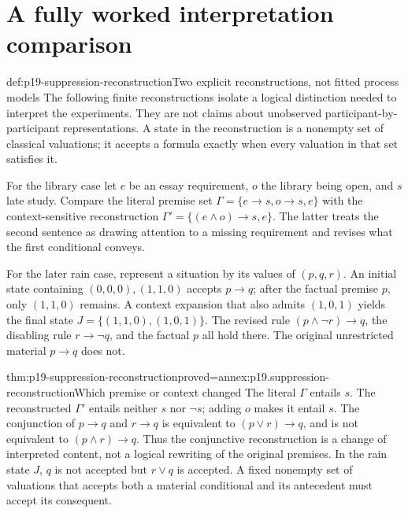 \section{A fully worked interpretation comparison}
\label{sec:p19-suppression-reconstruction}

\begin{hbdefinition}{def:p19-suppression-reconstruction}{Two explicit reconstructions, not fitted process models}
The following finite reconstructions isolate a logical distinction needed
to interpret the experiments. They are not claims about unobserved
participant-by-participant representations.
A state in the reconstruction is a nonempty set of classical valuations;
it accepts a formula exactly when every valuation in that set satisfies it.

For the library case let \(e\) be an essay requirement, \(o\) the library
being open, and \(s\) late study. Compare the literal premise set
\(\Gamma=\{e\to s,o\to s,e\}\) with the context-sensitive
reconstruction \(\Gamma'=\{(e\land o)\to s,e\}\).
The latter treats the second sentence as drawing attention to a missing
requirement and revises what the first conditional conveys.

For the later rain case, represent a situation by its values of
\((p,q,r)\). An initial state containing
\((0,0,0),(1,1,0)\) accepts \(p\to q\); after the factual premise
\(p\), only \((1,1,0)\) remains. A context expansion that also admits
\((1,0,1)\) yields the final state
\(J=\{(1,1,0),(1,0,1)\}\). The revised rule
\((p\land\neg r)\to q\), the disabling rule \(r\to\neg q\), and
the factual \(p\) all hold there. The original unrestricted material
\(p\to q\) does not.
\end{hbdefinition}

\begin{hblemma}{thm:p19-suppression-reconstruction}{proved=annex:p19.suppression-reconstruction}{Which premise or context changed}
The literal \(\Gamma\) entails \(s\). The reconstructed \(\Gamma'\)
entails neither \(s\) nor \(\neg s\); adding \(o\) makes it entail
\(s\). The conjunction of \(p\to q\) and \(r\to q\) is equivalent
to \((p\lor r)\to q\), and is not equivalent to
\((p\land r)\to q\). Thus the conjunctive reconstruction is a change
of interpreted content, not a logical rewriting of the original premises.
In the rain state \(J\), \(q\) is not accepted but \(r\lor q\) is
accepted. A fixed nonempty set of valuations that accepts both a material
conditional and its antecedent must accept its consequent.
\end{hblemma}

